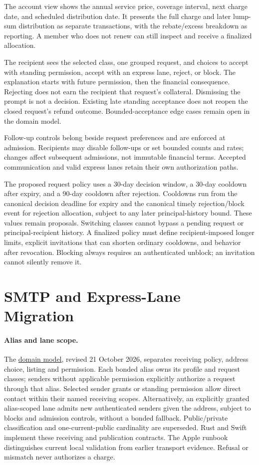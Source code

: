 \documentclass[11pt]{article}
\begin{document}
The account view shows the annual service price, coverage interval, next charge
date, and scheduled distribution date. It presents the full charge and later
lump-sum distribution as separate transactions, with the rebate/excess breakdown
as reporting. A member who does not renew can still inspect
and receive a finalized allocation.

The recipient sees the selected class, one grouped request, and choices to accept
with standing permission, accept with an express lane, reject, or block.
The explanation starts with future permission, then the financial consequence.
Rejecting does not earn the recipient that request's collateral. Dismissing the
prompt is not a decision. Existing late standing acceptance does not reopen the
closed request's refund outcome. Bounded-acceptance edge cases remain open
in the domain model.

Follow-up controls belong beside request preferences and are enforced at
admission. Recipients may disable follow-ups or set bounded counts and rates;
changes affect subsequent admissions, not immutable financial terms. Accepted
communication and valid express lanes retain their own authorization paths.

The proposed request policy uses a 30-day decision window, a 30-day cooldown
after expiry, and a 90-day cooldown after rejection. Cooldowns run from the
canonical decision deadline for expiry and the canonical timely rejection/block
event for rejection allocation, subject to any later principal-history bound.
These values remain proposals. Switching classes cannot bypass a pending request
or principal-recipient history. A finalized policy must define recipient-imposed
longer limits, explicit invitations that can shorten ordinary cooldowns, and
behavior after revocation. Blocking always requires an authenticated unblock;
an invitation cannot silently remove it.

\section{SMTP and Express-Lane Migration}

\paragraph{Alias and lane scope.}
The \href{DOMAIN_MODEL.md}{domain model}, revised 21 October 2026, separates
receiving policy, address choice, listing and permission. Each bonded alias owns
its profile and request classes; senders without applicable permission explicitly
authorize a request through that alias. Selected sender grants or standing
permission allow direct contact within their named receiving scopes. Alternatively,
an explicitly granted alias-scoped lane admits new authenticated senders given
the address, subject to blocks and admission controls, without a bonded fallback.
Public/private classification and one-current-public cardinality are superseded.
Rust and Swift implement these receiving and publication contracts. The Apple
runbook distinguishes current local validation from earlier transport evidence. Refusal or mismatch never authorizes a charge.
\end{document}
